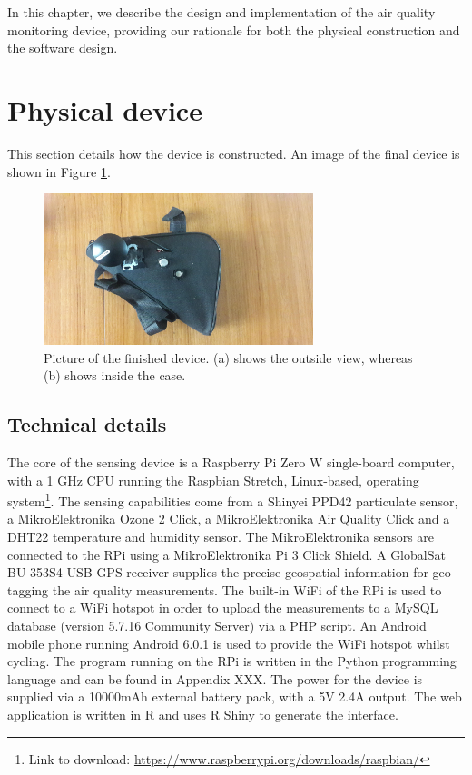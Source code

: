 \documentclass[11pt]{report}
\begin{document}
In this chapter, we describe the design and implementation of the air quality monitoring device, providing our rationale for both the physical construction and the software design.

\section{Physical device}

This section details how the device is constructed. An image of the final device is shown in Figure \ref{device}.

\begin{figure}[!htb]
\centering
\includegraphics[width=0.7\textwidth]{device}
\caption{Picture of the finished device. (a) shows the outside view, whereas (b) shows inside the case.}
\label{device}
\end{figure}



\subsection{Technical details}

The core of the sensing device is a Raspberry Pi Zero W single-board computer, with a 1 GHz CPU running the Raspbian Stretch, Linux-based, operating system\footnote{Link to download: \href{https://www.raspberrypi.org/downloads/raspbian/}{https://www.raspberrypi.org/downloads/raspbian/}}. The sensing capabilities come from a Shinyei PPD42 particulate sensor, a MikroElektronika Ozone 2 Click, a MikroElektronika Air Quality Click and a DHT22 temperature and humidity sensor. The MikroElektronika sensors are connected to the RPi using a MikroElektronika Pi 3 Click Shield. A GlobalSat BU-353S4 USB GPS receiver supplies the precise geospatial information for geo-tagging the air quality measurements. The built-in WiFi of the RPi is used to connect to a WiFi hotspot in order to upload the measurements to a MySQL database (version 5.7.16 Community Server) via a PHP script. An Android mobile phone running Android 6.0.1 is used to provide the WiFi hotspot whilst cycling. The program running on the RPi is written in the Python programming language and can be found in Appendix XXX. The power for the device is supplied via a 10000mAh external battery pack, with a 5V 2.4A output. The web application is written in R and uses R Shiny to generate the interface.
\end{document}
